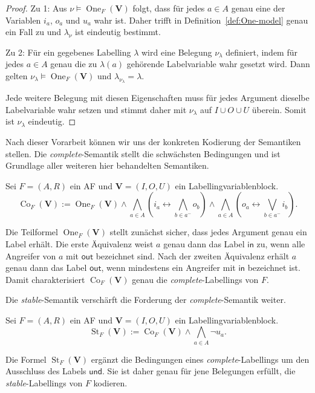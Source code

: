 \begin{proof}
    Zu 1: Aus
    \(\nu\models\operatorname{One}_F(\mathbf V)\)
    folgt, dass für jedes \(a\in A\) genau eine der Variablen
    \(i_a\), \(o_a\) und \(u_a\) wahr ist. Daher trifft in
    Definition~\ref{def:One-model} genau ein Fall zu und
    \(\lambda_\nu\) ist eindeutig bestimmt.

    Zu 2: Für ein gegebenes Labelling \(\lambda\) wird eine Belegung
    \(\nu_\lambda\) definiert, indem für jedes \(a\in A\) genau die
    zu \(\lambda(a)\) gehörende Labelvariable wahr gesetzt wird.
    Dann gelten
    \(\nu_\lambda\models\operatorname{One}_F(\mathbf V)\)
    und
    \(\lambda_{\nu_\lambda}=\lambda\).

    Jede weitere Belegung mit diesen Eigenschaften muss für jedes
    Argument dieselbe Labelvariable wahr setzen und stimmt daher mit
    \(\nu_\lambda\) auf \(I\cup O\cup U\) überein. Somit ist
    \(\nu_\lambda\) eindeutig.
\end{proof}

Nach dieser Vorarbeit können wir uns der konkreten Kodierung der Semantiken stellen.
Die \emph{complete}-Semantik stellt die schwächsten Bedingungen und ist Grundlage aller weiteren hier
behandelten Semantiken. 
\begin{Definition}
    \label{def:co-st-encodings}
    Sei \(F=(A,R)\) ein AF und
    \(\mathbf V=(I,O,U)\) ein Labellingvariablenblock.
    \[
        \operatorname{Co}_F(\mathbf V)
        :=
        \operatorname{One}_F(\mathbf V)
        \land
        \bigwedge_{a\in A}
        \left(
            i_a\leftrightarrow
            \bigwedge_{b\in a^-}o_b
        \right)
        \land
        \bigwedge_{a\in A}
        \left(
            o_a\leftrightarrow
            \bigvee_{b\in a^-}i_b
        \right).
    \]
\end{Definition}
Die Teilformel \(\operatorname{One}_F(\mathbf V)\) stellt zunächst sicher, dass jedes Argument genau ein Label erhält. 
Die erste Äquivalenz weist \(a\) genau dann das Label \(\mathsf{in}\) zu, wenn alle Angreifer von \(a\) mit \(\mathsf{out}\) bezeichnet sind. 
Nach der zweiten Äquivalenz erhält \(a\) genau dann das Label \(\mathsf{out}\), wenn mindestens ein Angreifer mit \(\mathsf{in}\) bezeichnet ist. 
Damit charakterisiert \(\operatorname{Co}_F(\mathbf V)\) genau die \emph{complete}-Labellings von \(F\).

Die \emph{stable}-Semantik verschärft die Forderung der \emph{complete}-Semantik weiter.
\begin{Definition}
    Sei \(F=(A,R)\) ein AF und
    \(\mathbf V=(I,O,U)\) ein Labellingvariablenblock.
    \[
        \operatorname{St}_F(\mathbf V)
        :=
        \operatorname{Co}_F(\mathbf V)
        \land
        \bigwedge_{a\in A}\neg u_a.
    \]
\end{Definition}
Die Formel \(\operatorname{St}_F(\mathbf V)\) ergänzt die Bedingungen eines \emph{complete}-Labellings um den Ausschluss des Labels 
\(\mathsf{und}\). Sie ist daher genau für jene Belegungen erfüllt, die \emph{stable}-Labellings von \(F\) kodieren.

